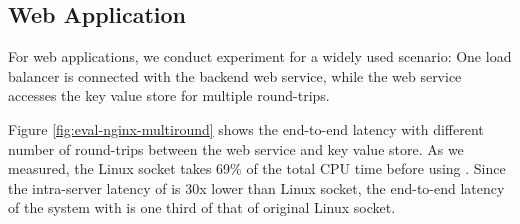 \begin{table*}[t]
	\centering
	\caption{Comparison of high performance socket systems.}
	\label{tab:related-work}
	\vspace{-15pt}
\end{table*}

\subsection{Web Application}
For web applications, we conduct experiment for a widely used scenario: One load balancer is connected with the backend web service, while the web service accesses the key value store for multiple round-trips.

Figure \ref{fig:eval-nginx-multiround} shows the end-to-end latency with different number of round-trips between the web service and key value store. As we measured, the Linux socket takes 69\% of the total CPU time before using \libipc. Since the intra-server latency of \sys{} is 30x lower than Linux socket, the end-to-end latency of the system with \sys{}  is one third of that of original Linux socket.




